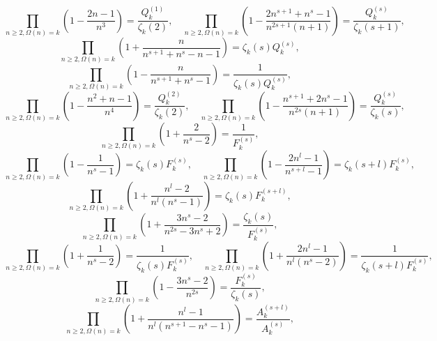 \documentclass{amsart}
\begin{document}
\begin{equation}
\prod_{n\ge 2,\Omega(n)=k}
\left( 1-\frac{2n-1}{n^3}\right)
=
\frac{ Q_k^{(1)} } { \zeta_k(2) },
\quad
\prod_{n\ge 2,\Omega(n)=k}
\left( 1-\frac{2n^{s+1}+n^s-1}{n^{2s+1}(n+1)}\right)
=
\frac{ Q_k^{(s)} } { \zeta_k(s+1) },
\end{equation}
\begin{equation}
\prod_{n\ge 2,\Omega(n)=k}
\left( 1+\frac{n}{n^{s+1}+n^s-n-1}\right)
=
\zeta_k(s)Q_k^{(s)},
\end{equation}
\begin{equation}
\prod_{n\ge 2,\Omega(n)=k}
\left( 1-\frac{n}{n^{s+1}+n^s-1}\right)
=
\frac{1}{\zeta_k(s)Q_k^{(s)}},
\end{equation}
\begin{equation}
\prod_{n\ge 2,\Omega(n)=k}
\left( 1-\frac{n^2+n-1}{n^4}\right)
=
\frac{ Q_k^{(2)} } { \zeta_k(2) },
\quad
\prod_{n\ge 2,\Omega(n)=k}
\left( 1-\frac{n^{s+1}+2n^s-1}{n^{2s}(n+1)}\right)
=
\frac{ Q_k^{(s)} } { \zeta_k(s) },
\end{equation}
\begin{equation}
\prod_{n\ge 2,\Omega(n)=k}
\left( 1+\frac{2}{n^s-2}\right)
=
\frac{1}{F_k^{(s)}},
\end{equation}
\begin{equation}
\prod_{n\ge 2,\Omega(n)=k}
\left( 1-\frac{1}{n^s-1}\right)
=
\zeta_k(s)F_k^{(s)},
\quad
\prod_{n\ge 2,\Omega(n)=k}
\left( 1-\frac{2n^l-1}{n^{s+l}-1}\right)
=
\zeta_k(s+l)F_k^{(s)},
\end{equation}
\begin{equation}
\prod_{n\ge 2,\Omega(n)=k}
\left( 1+\frac{n^l-2}{n^l(n^s-1)}\right)
=
\zeta_k(s)F_k^{(s+l)},
\end{equation}
\begin{equation}
\prod_{n\ge 2,\Omega(n)=k}
\left( 1+\frac{3n^s-2}{n^{2s}-3n^s+2}\right)
=
\frac{\zeta_k(s)}{F_k^{(s)}},
\end{equation}
\begin{equation}
\prod_{n\ge 2,\Omega(n)=k}
\left( 1+\frac{1}{n^s-2}\right)
=
\frac{1}{\zeta_k(s)F_k^{(s)}},
\quad
\prod_{n\ge 2,\Omega(n)=k}
\left( 1+\frac{2n^l-1}{n^l(n^s-2)}\right)
=
\frac{1}{\zeta_k(s+l)F_k^{(s)}},
\end{equation}
\begin{equation}
\prod_{n\ge 2,\Omega(n)=k}
\left( 1-\frac{3n^s-2}{n^{2s}}\right)
=
\frac{ F_k^{(s)} }{ \zeta_k(s)}
,
\end{equation}
\begin{equation}
\prod_{n\ge 2,\Omega(n)=k}
\left( 1+\frac{n^l-1}{n^l(n^{s+1}-n^s-1)}\right)
=
\frac{ A_k^{(s+l)} }{ A_k^{(s)}}
,
\end{equation}
\end{document}
